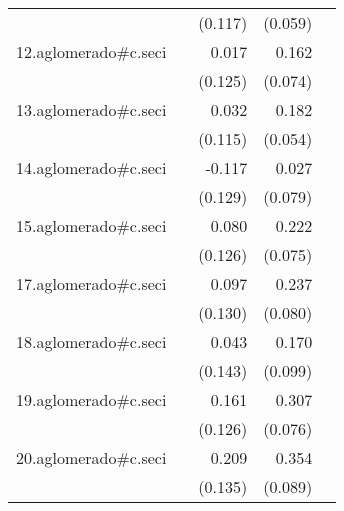 {\begin{longtable}{l*{4}{D{.}{.}{-1}}}
            &                     &     (0.117)         &     (0.059)         &                     \\
\addlinespace
12.aglomerado#c.seci&                     &       0.017         &       0.162\sym{*}  &                     \\
            &                     &     (0.125)         &     (0.074)         &                     \\
\addlinespace
13.aglomerado#c.seci&                     &       0.032         &       0.182\sym{***}&                     \\
            &                     &     (0.115)         &     (0.054)         &                     \\
\addlinespace
14.aglomerado#c.seci&                     &      -0.117         &       0.027         &                     \\
            &                     &     (0.129)         &     (0.079)         &                     \\
\addlinespace
15.aglomerado#c.seci&                     &       0.080         &       0.222\sym{**} &                     \\
            &                     &     (0.126)         &     (0.075)         &                     \\
\addlinespace
17.aglomerado#c.seci&                     &       0.097         &       0.237\sym{**} &                     \\
            &                     &     (0.130)         &     (0.080)         &                     \\
\addlinespace
18.aglomerado#c.seci&                     &       0.043         &       0.170         &                     \\
            &                     &     (0.143)         &     (0.099)         &                     \\
\addlinespace
19.aglomerado#c.seci&                     &       0.161         &       0.307\sym{***}&                     \\
            &                     &     (0.126)         &     (0.076)         &                     \\
\addlinespace
20.aglomerado#c.seci&                     &       0.209         &       0.354\sym{***}&                     \\
            &                     &     (0.135)         &     (0.089)         &                     \\

\end{longtable}}
